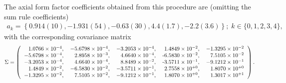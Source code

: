 The axial form factor coefficients obtained from this procedure are
 (omitting the sum rule coefficients)
\begin{align}
 a_k = \left\{ 0.914(10), -1.931(54), -0.63(30), 4.4(1.7), -2.2(3.6) \right\};
 \; k \in \{0,1,2,3,4\},
\end{align}
 with the corresponding covariance matrix
\begin{align}
 \Sigma =
\left(
\begin{tabular}{rrrrr}
%
%
$ 1.0766\times10^{-4}$,& $-5.6798\times10^{-4}$,& $-3.2053\times10^{-4}$,&  $1.4849\times10^{-2}$,& $-1.3295\times10^{-2}$ \nonumber\\
$-5.6798\times10^{-4}$,& $ 2.8958\times10^{-3}$,& $ 4.6640\times10^{-4}$,& -$6.5830\times10^{-2}$,& $ 7.5105\times10^{-2}$ \nonumber\\
$-3.2053\times10^{-4}$,& $ 4.6640\times10^{-4}$,& $ 8.8489\times10^{-2}$,& -$3.5711\times10^{-1}$,& $-9.1212\times10^{-1}$ \nonumber\\
$ 1.4849\times10^{-2}$,& $-6.5830\times10^{-2}$,& $-3.5711\times10^{-1}$,&  $2.7558\times10^{+0}$,& $ 1.8070\times10^{+0}$ \nonumber\\
$-1.3295\times10^{-2}$,& $ 7.5105\times10^{-2}$,& $-9.1212\times10^{-1}$,&  $1.8070\times10^{+0}$,& $ 1.3017\times10^{+1}$ \nonumber\\
\end{tabular}
\right).
\end{align}
